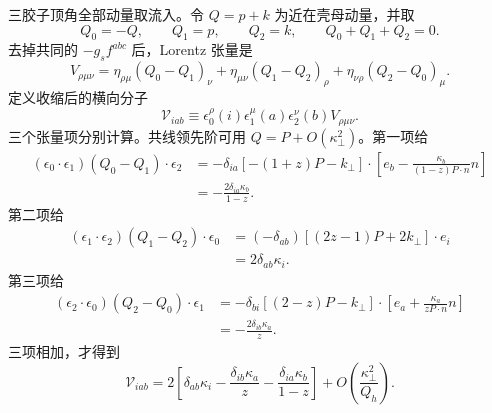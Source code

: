 \begin{derivation}[最低阶部分子分裂核]
三胶子顶角全部动量取流入。令 $Q=p+k$ 为近在壳母动量，并取
\begin{equation*}
 Q_0=-Q,
 \qquad Q_1=p,
 \qquad Q_2=k,
 \qquad Q_0+Q_1+Q_2=0.
\end{equation*}
去掉共同的 $-g_sf^{abc}$ 后，Lorentz 张量是
\begin{equation*}
 V_{\rho\mu\nu}
 =\eta_{\rho\mu}(Q_0-Q_1)_\nu
 +\eta_{\mu\nu}(Q_1-Q_2)_\rho
 +\eta_{\nu\rho}(Q_2-Q_0)_\mu.
\end{equation*}
定义收缩后的横向分子
\begin{equation*}
 \mathcal V_{iab}
 \equiv
 \epsilon_0^\rho(i)\epsilon_1^\mu(a)\epsilon_2^\nu(b)
 V_{\rho\mu\nu}.
\end{equation*}
三个张量项分别计算。共线领先阶可用 $Q=P+O(\kappa_\perp^2)$。第一项给
\begin{align*}
 (\epsilon_0\cdot\epsilon_1)
 (Q_0-Q_1)\cdot\epsilon_2
 &=-\delta_{ia}
 \left[-(1+z)P-k_\perp\right]\cdot
 \left[e_b-\frac{\kappa_b}{(1-z)P\cdot n}n\right]\\
 &=-\frac{2\delta_{ia}\kappa_b}{1-z}.
\end{align*}
第二项给
\begin{align*}
 (\epsilon_1\cdot\epsilon_2)
 (Q_1-Q_2)\cdot\epsilon_0
 &=(-\delta_{ab})
 \left[(2z-1)P+2k_\perp\right]\cdot e_i\\
 &=2\delta_{ab}\kappa_i.
\end{align*}
第三项给
\begin{align*}
 (\epsilon_2\cdot\epsilon_0)
 (Q_2-Q_0)\cdot\epsilon_1
 &=-\delta_{bi}
 \left[(2-z)P-k_\perp\right]\cdot
 \left[e_a+\frac{\kappa_a}{zP\cdot n}n\right]\\
 &=-\frac{2\delta_{ib}\kappa_a}{z}.
\end{align*}
三项相加，才得到
\begin{equation*}
 \mathcal V_{iab}
 =2\left[
 \delta_{ab}\kappa_i
 -\frac{\delta_{ib}\kappa_a}{z}
 -\frac{\delta_{ia}\kappa_b}{1-z}
 \right]
 +O\!\left(\frac{\kappa_\perp^2}{Q_h}\right).
\end{equation*}


\end{derivation}
